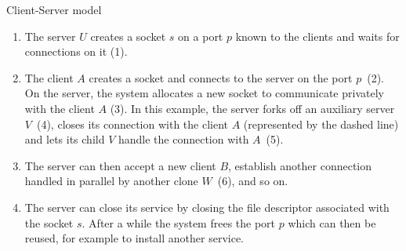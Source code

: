 \begin{myfigure}
\begin{myimage}[width="70\%"]
\end{myimage}
\caption{Client-Server model}
\label{fig/client-server}
\end{myfigure}

\begin{enumerate}
\item
The server $U$ creates a socket $s$ on a port $p$ known to the clients and
waits for connections on it (1).
%
\item
The client $A$ creates a socket and connects to the server on the port
$p$~(2). On the server, the system allocates a new socket to
communicate privately with
the client $A$ (3). In this example, the server forks off an auxiliary
server $V$~(4), closes its connection with the client $A$ (represented by the
dashed line) and lets its child $V$ handle the connection with $A$~(5).
%
\item
The server can then accept a new client $B$, establish another
connection handled in parallel by another clone $W$~(6), and so on.
%
\item
The server can close its service by closing the file descriptor
associated with the socket $s$. After a while the system frees the
port $p$ which can then be reused, for example to install another
service.

\end{enumerate}

